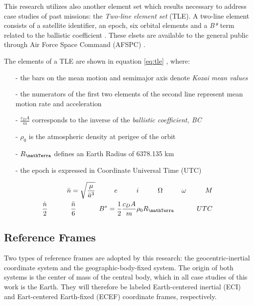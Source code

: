 This research utilizes also another element set which results necessary to address case studies of past missions: the \textit{Two-line element set} (TLE).
A two-line element consists of a satellite identifier, an epoch, six orbital elements and a \textit{B*} term related to the ballistic coefficient \cite{riesing2015orbit}.
These elsets are available to the general public through Air Force Space Command (AFSPC) \cite{vallado2013fundamentals}.

The elements of a TLE are shown in equation \ref{eq:tle} \cite{vallado2013fundamentals}, where:
\begin{itemize}
    \item[-] the bars on  the mean motion and semimajor axis denote \textit{Kozai mean values} 
    \item[-] the numerators of the first two elements of the second line represent mean motion rate and acceleration
    \item[-] $\frac{c_D A}{m}$ corresponds to the inverse of the \textit{ballistic coefficient, BC}
    \item[-] $\rho_0$ is the atmospheric density at perigee of the orbit
    \item[-] $R_\mathTerra$ defines an Earth Radius of 6378.135 km
    \item[-] the epoch is expressed in Coordinate Universal Time (UTC)
\end{itemize}

\begin{equation} \label{eq:tle}
    \begin{split}
        \bar{n}=\sqrt{\frac{\mu}{\bar{a}^{3}}} \;\;\;\;\;\;\;\;\;\; e \;\;\;\;\;\;\;\;\;\; i \;\;\;\;\;\;\;\;\;\; \Omega \;\;\;\;\;\;\;\;\;\; \omega \;\;\;\;\;\;\;\;\;\; M \\
        \frac{\dot{n}}{2} \;\;\;\;\;\;\;\;\;\;\;\; \frac{\ddot{n}}{6} \;\;\;\;\;\;\;\;\;\;\;\; B^* = \frac{1}{2} \frac{c_D A}{m} \rho_0 R_\mathTerra \;\;\;\;\;\;\;\;\;\;\;\; UTC
    \end{split}
\end{equation}

\subsection{Reference Frames}
Two types of reference frames are adopted by this research: the geocentric-inertial coordinate system and the geographic-body-fixed system.
The origin of both systems is the center of mass of the central body, which in all case studies of this work is the Earth.
They will therefore be labeled Earth-centered inertial (ECI) and Eart-centered Earth-fixed (ECEF) coordinate frames, respectively.


